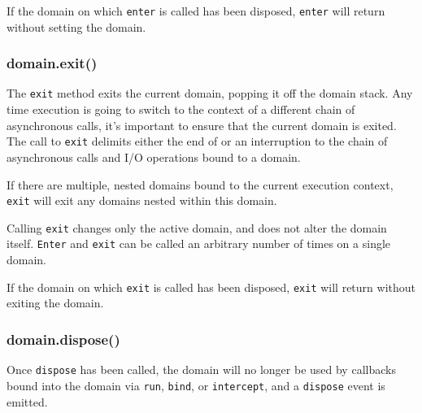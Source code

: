 If the domain on which \texttt{enter} is called has been disposed,
\texttt{enter} will return without setting the domain.

\subsubsection{domain.exit()}

The \texttt{exit} method exits the current domain, popping it off the
domain stack. Any time execution is going to switch to the context of a
different chain of asynchronous calls, it's important to ensure that the
current domain is exited. The call to \texttt{exit} delimits either the
end of or an interruption to the chain of asynchronous calls and I/O
operations bound to a domain.

If there are multiple, nested domains bound to the current execution
context, \texttt{exit} will exit any domains nested within this domain.

Calling \texttt{exit} changes only the active domain, and does not alter
the domain itself. \texttt{Enter} and \texttt{exit} can be called an
arbitrary number of times on a single domain.

If the domain on which \texttt{exit} is called has been disposed,
\texttt{exit} will return without exiting the domain.

\subsubsection{domain.dispose()}

\begin{Shaded}
\begin{Highlighting}[]
\NormalTok{: } \NormalTok{- }
\end{Highlighting}
\end{Shaded}

Once \texttt{dispose} has been called, the domain will no longer be used
by callbacks bound into the domain via \texttt{run}, \texttt{bind}, or
\texttt{intercept}, and a \texttt{dispose} event is emitted.
